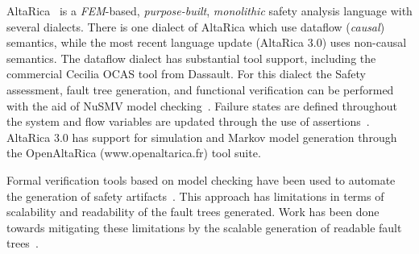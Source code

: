 AltaRica~\cite{PROSVIRNOVA2013127,BieberERTS2018} is a {\em FEM}-based, {\em purpose-built}, {\em monolithic} safety analysis language with several dialects.  There is one dialect of AltaRica which use dataflow ({\em causal}) semantics, while the most recent language update (AltaRica 3.0) uses non-causal semantics.  The dataflow dialect has substantial tool support, including the commercial Cecilia OCAS tool from Dassault.  For this dialect the Safety assessment, fault tree generation, and functional verification can be performed with the aid of NuSMV model checking~\cite{symbAltaRica}. Failure states are defined throughout the system and flow variables are updated through the use of assertions~\cite{Bieber04safetyassessment}.  AltaRica 3.0 has support for simulation and Markov model generation through the OpenAltaRica (www.openaltarica.fr) tool suite.

Formal verification tools based on model checking have been used to automate the generation of safety artifacts~\cite{symbAltaRica,10.1007/978-3-540-75596-8-13, DBLP:conf/tacas/BittnerBCCGGMMZ16}. This approach has limitations in terms of scalability and readability of the fault trees generated. Work has been done towards mitigating these limitations by the scalable generation of readable fault trees~\cite{10.1007/978-3-319-11936-6-7}.




